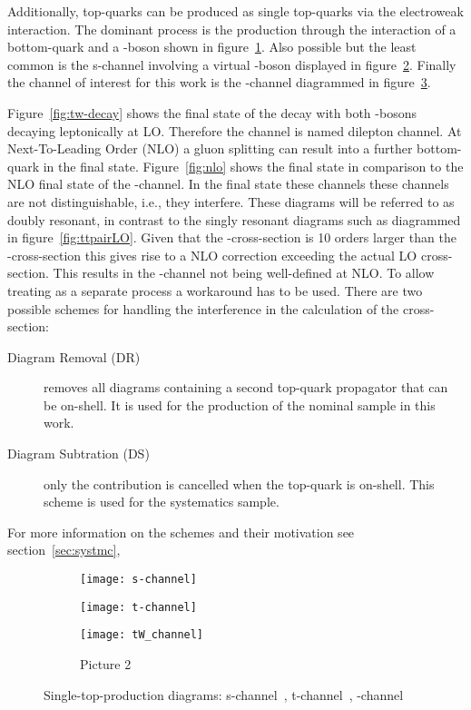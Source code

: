 Additionally, top-quarks can be produced as single top-quarks via the electroweak interaction. The dominant process is the production through the interaction of a bottom-quark and a \PW-boson shown in figure~\ref{fig:singletop:virtualWt}. Also possible but the least common is the s-channel involving a virtual \PW-boson displayed in figure~\ref{fig:singletop:virtualWs}. Finally the channel of interest for this work is the \tW-channel diagrammed in figure~\ref{fig:singletop:tW}.

Figure~\ref{fig:tw-decay} shows the final state of the \tW decay with both \PW-bosons decaying leptonically at LO. Therefore the channel is named dilepton channel.
At Next-To-Leading Order (NLO) a gluon splitting can result into a further bottom-quark in the final state. Figure~\ref{fig:nlo} shows the \ttbar final state in comparison to the NLO final state of the \tW-channel. In the final state these channels these channels are not distinguishable, {i.e.}, they interfere. These diagrams will be referred to as doubly resonant, in contrast to the singly resonant diagrams such as diagrammed in figure~\ref{fig:ttpairLO}.
Given that the \ttbar-cross-section is \num{10} orders larger than the \tW-cross-section this gives rise to a NLO correction exceeding the actual LO cross-section. This results in the \tW-channel not being well-defined at NLO.
To allow treating \tW as a separate process a workaround has to be used. There are two possible schemes for handling the interference in the calculation of the cross-section:

\begin{description}
\item[Diagram Removal (DR)] removes all diagrams containing a second top-quark propagator that can be on-shell. It is used for the production of the nominal sample in this work.
\item[Diagram Subtration (DS)] only the \ttbar contribution is cancelled when the top-quark is on-shell. This scheme is used for the systematics sample.
\end{description}

For more information on the schemes and their motivation see section~\ref{sec:systmc},

\begin{figure}[htbp]
  \begin{subfigure}[b]{0.3\textwidth}
  	\centering
    \texttt{[image: s-channel]}
    \caption{}
    \label{fig:singletop:virtualWt}
  \end{subfigure}
  \quad
  \begin{subfigure}[b]{0.3\textwidth}
  	\centering
    \texttt{[image: t-channel]}
    \caption{}
    \label{fig:singletop:virtualWs}
  \end{subfigure}
  \quad
  \begin{subfigure}[b]{0.3\textwidth}
  	\centering
    \texttt{[image: tW\_channel]}
    \caption{Picture 2}
	\label{fig:singletop:tW}
  \end{subfigure} 
  \caption{Single-top-production diagrams: s-channel~, t-channel~, \tW-channel~}
  \label{fig:singletop}
\end{figure}


